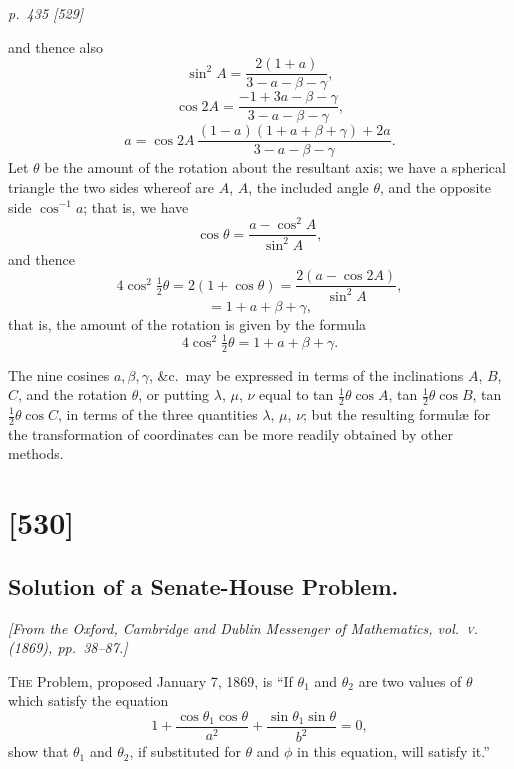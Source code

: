 \documentclass[11pt,a4paper]{article}
\theoremstyle{plain}
\theoremstyle{definition}
\begin{document}
\clearpage

\bigskip
\textit{p.~435 [529]}
\smallskip

\noindent
and thence also
\[
\sin^2 A = \frac{2(1 + a)}{3 - a - \beta - \gamma},
\]
\[
\cos 2A = \frac{- 1 + 3a - \beta - \gamma}{3 - a - \beta - \gamma},
\]
\[
a = \cos 2A\,\frac{(1 - a)(1 + a + \beta + \gamma) + 2a}{3 - a - \beta - \gamma}.
\]
Let $\theta$ be the amount of the rotation about the resultant axis; we have a spherical
triangle the two sides whereof are $A$, $A$, the included angle $\theta$, and the opposite side
$\cos^{-1} a$; that is, we have
\[
\cos\theta = \frac{a - \cos^2 A}{\sin^2 A},
\]
and thence
\[
4\cos^2\tfrac{1}{2}\theta = 2(1 + \cos\theta) = \frac{2(a - \cos 2A)}{\sin^2 A},
\]
\[
= 1 + a + \beta + \gamma,
\]
that is, the amount of the rotation is given by the formula
\[
4\cos^2\tfrac{1}{2}\theta = 1 + a + \beta + \gamma.
\]

The nine cosines $a, \beta, \gamma$, \&c.\ may be expressed in terms of the inclinations $A$, $B$, $C$,
and the rotation $\theta$, or putting $\lambda$, $\mu$, $\nu$ equal to tan $\tfrac{1}{2}\theta\cos A$, tan $\tfrac{1}{2}\theta\cos B$, tan $\tfrac{1}{2}\theta\cos C$,
in terms of the three quantities $\lambda$, $\mu$, $\nu$; but the resulting formul\ae{} for the transformation of coordinates can be more readily obtained by other methods.

\clearpage

\section{[530]}
\subsection{Solution of a Senate-House Problem.}

\begin{center}
\textit{[From the Oxford, Cambridge and Dublin Messenger of Mathematics, vol.~\textsc{v}. (1869), pp.~38--87.]}
\end{center}

\textsc{The} Problem, proposed January 7, 1869, is ``If $\theta_1$ and $\theta_2$ are two values of $\theta$
which satisfy the equation
\[
1 + \frac{\cos\theta_1\cos\theta}{a^2} + \frac{\sin\theta_1\sin\theta}{b^2} = 0,
\]
show that $\theta_1$ and $\theta_2$, if substituted for $\theta$ and $\phi$ in this equation, will satisfy it.''
\end{document}
